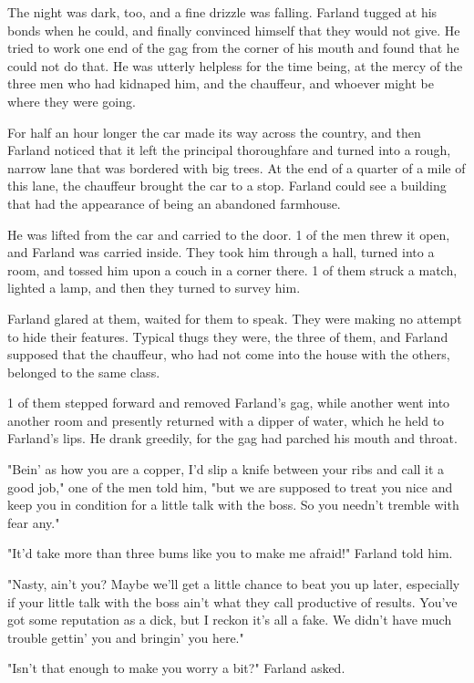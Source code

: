 \documentclass{novel}
\begin{document}
The night was dark, too, and a fine drizzle was falling. Farland tugged at his bonds when he could, and finally convinced himself that they would not give. He tried to work one end of the gag from the corner of his mouth and found that he could not do that. He was utterly helpless for the time being, at the mercy of the three men who had kidnaped him, and the chauffeur, and whoever might be where they were going.

For half an hour longer the car made its way across the country, and then Farland noticed that it left the principal thoroughfare and turned into a rough, narrow lane that was bordered with big trees. At the end of a quarter of a mile of this lane, the chauffeur brought the car to a stop. Farland could see a building that had the appearance of being an abandoned farmhouse.

He was lifted from the car and carried to the door. 1 of the men threw it open, and Farland was carried inside. They took him through a hall, turned into a room, and tossed him upon a couch in a corner there. 1 of them struck a match, lighted a lamp, and then they turned to survey him.

Farland glared at them, waited for them to speak. They were making no attempt to hide their features. Typical thugs they were, the three of them, and Farland supposed that the chauffeur, who had not come into the house with the others, belonged to the same class.

1 of them stepped forward and removed Farland's gag, while another went into another room and presently returned with a dipper of water, which he held to Farland's lips. He drank greedily, for the gag had parched his mouth and throat.

"Bein' as how you are a copper, I'd slip a knife between your ribs and call it a good job," one of the men told him, "but we are supposed to treat you nice and keep you in condition for a little talk with the boss. So you needn't tremble with fear any."

"It'd take more than three bums like you to make me afraid!" Farland told him.

"Nasty, ain't you? Maybe we'll get a little chance to beat you up later, especially if your little talk with the boss ain't what they call productive of results. You've got some reputation as a dick, but I reckon it's all a fake. We didn't have much trouble gettin' you and bringin' you here."

"Isn't that enough to make you worry a bit?" Farland asked.
\end{document}

